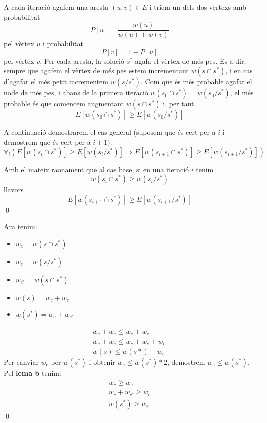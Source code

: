 A cada iteració agafem una aresta $(u,v) \in E$ i triem un dels dos vèrtexs amb probabilitat  
\[
P[u]=\frac{w(u)}{w(u)+w(v)}
\]
pel vèrtex $u$ i probabilitat
\[
P[v]=1-P[u]
\]
pel vèrtex $v$. Per cada aresta, la solució $s^{*}$ agafa el vèrtex de més pes. Es a dir, sempre que agafem el vèrtex de més pes estem incrementant $w(s \cap s^{*})$, i en cas d'agafar el més petit incrementem $w(s/s^{*})$.
Com que és més probable agafar el node de més pes, i abans de la primera iteració $w(s_0 \cap s^{*}) = w(s_0 / s^{*})$, el més probable és que comencem augmentant $w(s \cap s^{*})$ i, per tant
\[
E[w(s_0 \cap s^{*})] \geq E[w(s_0 / s^{*})]
\]

A continuació demostrarem el cas general (suposem que és cert per a $i$ i demostrem que és cert per a $i+1$):
\[
\forall_i(E[w(s_i \cap s^{*})] \geq E[w(s_i / s^{*})] \Rightarrow E[w(s_{i+1} \cap s^{*})] \geq E[w(s_{i+1}/s^{*})])
\]

Amb el mateix raonament que al cas base, si en una iteració $i$ tenim 
\[
w(s_i \cap s^{*}) \geq w(s_i / s^{*})
\]
llavors
\[
E[w(s_{i+1} \cap s^{*})] \geq E[w(s_{i+1} / s^{*})]
\]
\renewcommand\qedsymbol{$\square$}
\qed
\newpage

Ara tenim:
\begin{itemize}
    \item $w_c = w(s \cap s^{*})$
    \item $w_e = w(s / s^{*})$
    \item $w_{c'} = w(s \cap s^{*})$
    \item $w(s) = w_c+w_e$
    \item $w(s^{*}) = w_c+w_{c'}$
\end{itemize}
\begin{eqnarray}
    w_c+w_e \leq w_c+w_e \nonumber\\ 
    w_c+w_e \leq w_c+w_e+w_{c'}  \nonumber\\ 
    w(s) \leq w(s*)+w_e  \nonumber
\end{eqnarray}
Per canviar $w_e$ per $w(s^{*})$ i obtenir $w_e \leq w(s^{*})*2$, demostrem $w_e \leq w(s^{*})$.
Pel \textbf{lema b} tenim:
\begin{eqnarray}
    w_c \geq w_e \nonumber\\ 
    w_c+w_{c'} \geq w_e  \nonumber\\ 
    w(s^{*}) \geq w_e  \nonumber
\end{eqnarray}
\renewcommand\qedsymbol{$\blacksquare$}
\qed